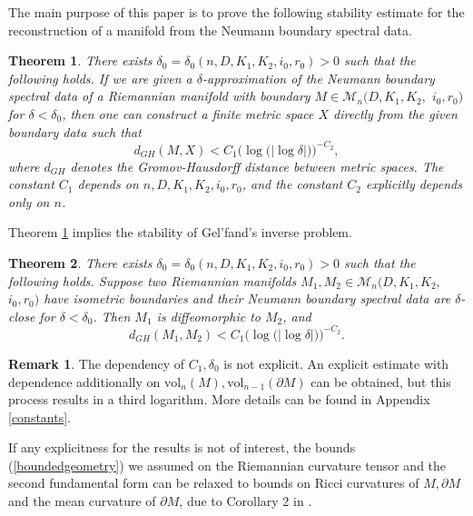 \documentclass[11pt,letterpaper]{amsart}
\numberwithin{equation}{section}
\theoremstyle{definition}
\theoremstyle{plain}
\newtheorem{stability}{Theorem}
\newtheorem{Cor1}[stability]{Theorem}
\theoremstyle{definition}
\theoremstyle{plain}
\theoremstyle{definition}
\newtheorem{remark0}{Remark}
\theoremstyle{plain}
\newcommand{\vol}{\textrm{vol}}
\begin{document}
\medskip
The main purpose of this paper is to prove the following stability estimate for the reconstruction of a manifold from the Neumann boundary spectral data.

\begin{stability}\label{stability}
There exists $\delta_0=\delta_0(n,D,K_1,K_2,i_0,r_0) >0$ such that the following holds. If we are given a $\delta$-approximation of the Neumann boundary spectral data of a Riemannian manifold with boundary $M\in \mathcal{M}_n(D,K_1,K_2,$ $i_0,r_0)$ for $\delta<\delta_0$, then one can construct a finite metric space $X$ directly from the given boundary data such that
$$d_{GH}(M,X)< C_1\Big( \log\big(|\log\delta|\big) \Big)^{-C_2},$$
where $d_{GH}$ denotes the Gromov-Hausdorff distance between metric spaces. The constant $C_1$ depends on $n,D,K_1,K_2,i_0,r_0$, and the constant $C_2$ explicitly depends only on $n$.
\end{stability}

Theorem \ref{stability} implies the stability of Gel'fand's inverse problem.

\begin{Cor1}\label{Cor1}
There exists $\delta_0=\delta_0(n,D,K_1,K_2,i_0,r_0)>0$ such that the following holds. Suppose two Riemannian manifolds $M_1,M_2\in \mathcal{M}_n(D,K_1,K_2,$ $i_0,r_0)$ have isometric boundaries and their Neumann boundary spectral data are $\delta$-close for $\delta<\delta_0$. Then $M_1$ is diffeomorphic to $M_2$, and
$$d_{GH}(M_1,M_2)< C_1 \Big( \log\big(|\log\delta|\big) \Big)^{-C_2}.$$
\end{Cor1}


\begin{remark0}
The dependency of $C_1,\delta_0$ is not explicit. An explicit estimate with dependence additionally on $\vol_n(M),\vol_{n-1}(\partial M)$ can be obtained, but this process results in a third logarithm. More details can be found in Appendix \ref{constants}.

If any explicitness for the results is not of interest, the bounds (\ref{boundedgeometry}) we assumed on the Riemannian curvature tensor and the second fundamental form can be relaxed to bounds on Ricci curvatures of $M,\partial M$ and the mean curvature of $\partial M$, due to Corollary 2 in \cite{KKL2}.
\end{remark0}
\end{document}
